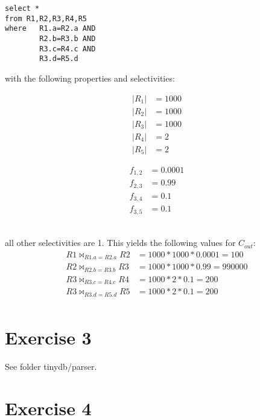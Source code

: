 \documentclass[11pt,a4paper]{scrartcl}
\begin{document}
\begin{verbatim}
select *
from R1,R2,R3,R4,R5
where 	R1.a=R2.a AND
		R2.b=R3.b AND
		R3.c=R4.c AND
		R3.d=R5.d
\end{verbatim}
with the following properties and selectivities:\\
\begin{minipage}{.2\textwidth}
\begin{align*}
|R_1|&=1000\\
|R_2|&=1000\\
|R_3|&=1000\\
|R_4|&=2\\
|R_5|&=2
\end{align*}
\end{minipage}
\begin{minipage}{.2\textwidth}
\begin{align*}
f_{1,2}&=0.0001\\
f_{2,3}&=0.99\\
f_{3,4}&=0.1\\
f_{3,5}&=0.1
\end{align*}
\end{minipage}\\
all other selectivities are 1.
This yields the following values for $C_{out}$:
\begin{align*}
R1 \bowtie_{R1.a=R2.a} R2 &= 1000*1000*0.0001 = 100\\
R2 \bowtie_{R2.b=R3.b} R3 &= 1000*1000*0.99 = 990000\\
R3 \bowtie_{R3.c=R4.c} R4 &= 1000*2*0.1 = 200\\
R3 \bowtie_{R3.d=R5.d} R5 &= 1000*2*0.1 = 200\\
\end{align*}


\section*{Exercise 3}
See folder tinydb/parser.


\section*{Exercise 4}
\end{document}
